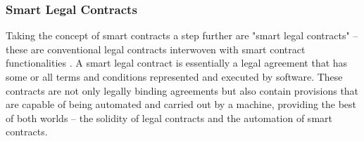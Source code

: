 \subsubsection{Smart Legal Contracts}
\label{subsec:smart_legal_contracts}
Taking the concept of smart contracts a step further are "smart legal contracts" – these are conventional legal contracts interwoven with smart contract functionalities \citep{ruhl2021smart}. A smart legal contract is essentially a legal agreement that has some or all terms and conditions represented and executed by software. These contracts are not only legally binding agreements but also contain provisions that are capable of being automated and carried out by a machine, providing the best of both worlds – the solidity of legal contracts and the automation of smart contracts.
